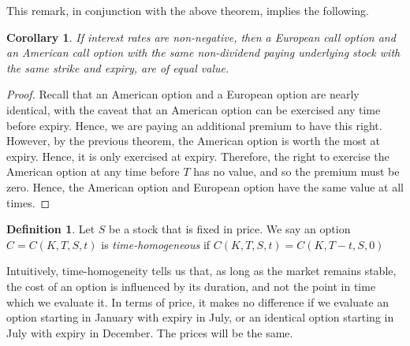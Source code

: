 \documentclass[12pt]{article}
\theoremstyle{plain}
\newtheorem{corollary}[theorem]{Corollary}
\theoremstyle{definition}
\newtheorem*{definition}{Definition}
\theoremstyle{remark}
\numberwithin{equation}{section}  %
\begin{document}
This remark, in conjunction with the above theorem, implies the following.
\begin{corollary}\label{cor:am-eu-equiv}
	If interest rates are non-negative, then a European call option and an 
	American call option with the same
	non-dividend paying underlying stock with the same strike and expiry, are 
	of equal value.
\end{corollary}
\begin{proof}
	Recall that an American option and a European option are nearly identical,
	with the caveat that an American option can be exercised any time before 
	expiry.
	Hence, we are paying an additional premium to have this right.
	However, by the previous theorem, the American option is worth the most at 
	expiry.
	Hence, it is only exercised at expiry. Therefore, the right to exercise
	the American option at any time before $T$ has no value, and so the premium
	must be zero. Hence, the American option and European option have the same 
	value at all times.
\end{proof}
\begin{definition}
	Let $S$ be a stock that is fixed in price.
	We say an option $C = C(K, T, S, t)$  is \emph{time-homogeneous} 
	if $C(K, T, S, t) = C(K, T-t, S, 0)$
\end{definition}
Intuitively, time-homogeneity tells us that, as long as the market remains
stable, the cost of an option is influenced by its duration, and not the point
in time which we evaluate it. In terms of price, it makes no difference if we
evaluate an option starting in January with expiry in July, or an identical
option starting in July with expiry in December.  The prices will be the same.
\end{document}
